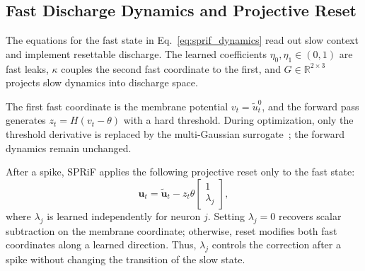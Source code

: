 \documentclass[letterpaper]{article} %
\begin{document}
\subsection{Fast Discharge Dynamics and Projective Reset}

The equations for the fast state in Eq.~\eqref{eq:sprif_dynamics} read out slow context and implement resettable discharge. The learned coefficients $\eta_0,\eta_1\in(0,1)$ are fast leaks, $\kappa$ couples the second fast coordinate to the first, and $G\in\mathbb{R}^{2\times3}$ projects slow dynamics into discharge space.

The first fast coordinate is the membrane potential $v_t=\widetilde{u}_t^0$, and the forward pass generates $z_t=H(v_t-\theta)$ with a hard threshold. During optimization, only the threshold derivative is replaced by the multi-Gaussian surrogate~\cite{asrnn}; the forward dynamics remain unchanged.

After a spike, SPRiF applies the following projective reset only to the fast state:
\begin{equation}
\mathbf{u}_t=\widetilde{\mathbf{u}}_t-z_t\theta
\begin{bmatrix}1\\\lambda_j\end{bmatrix},
\label{eq:projective_reset}
\end{equation}
where $\lambda_j$ is learned independently for neuron $j$. Setting $\lambda_j=0$ recovers scalar subtraction on the membrane coordinate; otherwise, reset modifies both fast coordinates along a learned direction. Thus, $\lambda_j$ controls the correction after a spike without changing the transition of the slow state.
\end{document}
